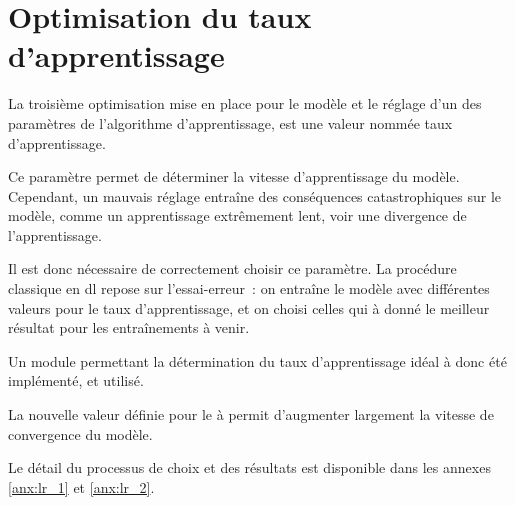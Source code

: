 \section{Optimisation du taux d'apprentissage}
La troisième optimisation mise en place pour le modèle et le réglage d'un des paramètres de l'algorithme d'apprentissage, est une valeur nommée \og taux d'apprentissage\fg{}.

Ce paramètre permet de déterminer la vitesse d'apprentissage du modèle.
Cependant, un mauvais réglage entraîne des conséquences catastrophiques sur le modèle, comme un apprentissage extrêmement lent, voir une divergence de l'apprentissage.

Il est donc nécessaire de correctement choisir ce paramètre.
La procédure classique en \gls{dl} repose sur l'essai-erreur~: on entraîne le modèle avec différentes valeurs pour le taux d'apprentissage, et on choisi celles qui à donné le meilleur résultat pour les entraînements à venir.

Un module permettant la détermination du taux d'apprentissage idéal à donc été implémenté, et utilisé.

La nouvelle valeur définie pour le à permit d'augmenter largement la vitesse de convergence du modèle. %

Le détail du processus de choix et des résultats est disponible dans les annexes \ref{anx:lr_1} et \ref{anx:lr_2}.
